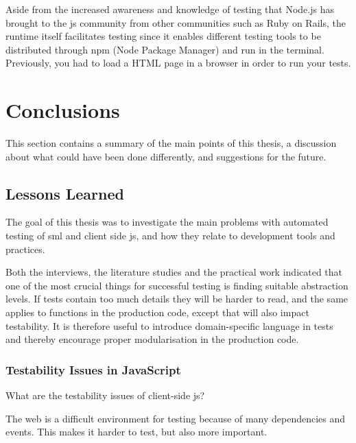 \documentclass[11pt]{article}
\begin{document}
Aside from the increased awareness and knowledge of testing that Node.js has brought to the \gls{js} community from other communities such as Ruby on Rails, the runtime itself facilitates testing since it enables different testing tools to be distributed through npm (Node Package Manager) and run in the terminal. Previously, you had to load a HTML page in a browser in order to run your tests. \cite[question~9]{Stenmark}


\section{Conclusions}
\label{sec:conclusions}

This section contains a summary of the main points of this thesis, a discussion about what could have been done differently, and suggestions for the future.

\subsection{Lessons Learned}

The goal of this thesis was to investigate the main problems with automated testing of \gls{sml} and client side \gls{js}, and how they relate to development tools and practices.

Both the interviews, the literature studies and the practical work indicated that one of the most crucial things for successful testing is finding suitable abstraction levels. If tests contain too much details they will be harder to read, and the same applies to functions in the production code, except that will also impact testability. It is therefore useful to introduce domain-specific language in tests \cite[p.~127]{Clean} and thereby encourage proper modularisation in the production code.

\subsubsection{Testability Issues in JavaScript}
\label{subsubsec:whynotjs}

What are the testability issues of client-side \gls{js}?

The web is a difficult environment for testing because of many dependencies and events. This makes it harder to test, but also more important.
\end{document}
